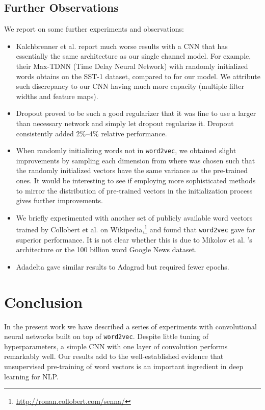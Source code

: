 \documentclass[11pt]{article}
\begin{document}
\subsection{Further Observations}
We report on some further experiments and observations:
\begin{itemize}
\item Kalchbrenner et al.  report much worse results with a CNN that has essentially the same architecture as our single channel model. For example, their Max-TDNN (Time Delay Neural Network) with randomly initialized words obtains  on the SST-1 dataset, compared to  for our model. We attribute such discrepancy to our CNN having much more capacity (multiple filter widths and feature maps).
\item Dropout proved to be such a good regularizer that it was fine to use a larger than necessary network and simply let dropout regularize it. Dropout consistently added 2\%--4\% relative performance.
\item When randomly initializing words not in \texttt{word2vec}, we obtained slight improvements by sampling each dimension from  where  was chosen such that the randomly initialized vectors have the same variance as the pre-trained ones. It would be interesting to see if employing more sophisticated methods to mirror the distribution of pre-trained vectors in the initialization process gives further improvements.
\item We briefly experimented with another set of publicly available word vectors trained by Collobert et al.  on Wikipedia,\footnote{\url{http://ronan.collobert.com/senna/}} and found that \texttt{word2vec} gave far superior performance. It is not clear whether this is due to Mikolov et al. 's architecture or the 100 billion word Google News dataset.
\item Adadelta \cite{Zeiler:2012} gave similar results to Adagrad \cite{Duchi:2011} but required fewer epochs.
\end{itemize}

\section{Conclusion}
In the present work we have described a series of experiments with convolutional neural networks built on top of \texttt{word2vec}. Despite little tuning of hyperparameters, a simple CNN with one layer of convolution performs remarkably well. Our results add to the well-established evidence that unsupervised pre-training of word vectors is an important ingredient in deep learning for NLP.
\end{document}
